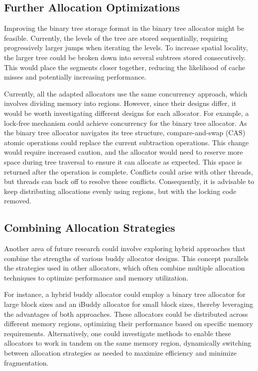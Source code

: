 \subsection{Further Allocation Optimizations} \label{sec:futureworkOptimizations}
Improving the binary tree storage format in the binary tree allocator might be feasible. Currently, the levels of the tree are stored sequentially, requiring progressively larger jumps when iterating the levels. To increase spatial locality, the larger tree could be broken down into several subtrees stored consecutively. This would place the segments closer together, reducing the likelihood of cache misses and potentially increasing performance.

Currently, all the adapted allocators use the same concurrency approach, which involves dividing memory into regions. However, since their designs differ, it would be worth investigating different designs for each allocator. For example, a lock-free mechanism could achieve concurrency for the binary tree allocator. As the binary tree allocator navigates its tree structure, compare-and-swap (CAS) atomic operations could replace the current subtraction operations. This change would require increased caution, and the allocator would need to reserve more space during tree traversal to ensure it can allocate as expected. This space is returned after the operation is complete. Conflicts could arise with other threads, but threads can back off to resolve these conflicts. Consequently, it is advisable to keep distributing allocations evenly using regions, but with the locking code removed.

% 

\subsection{Combining Allocation Strategies} \label{sec:futureworkCombine}
Another area of future research could involve exploring hybrid approaches that combine the strengths of various buddy allocator designs. This concept parallels the strategies used in other allocators, which often combine multiple allocation techniques to optimize performance and memory utilization.

For instance, a hybrid buddy allocator could employ a binary tree allocator for large block sizes and an iBuddy allocator for small block sizes, thereby leveraging the advantages of both approaches. These allocators could be distributed across different memory regions, optimizing their performance based on specific memory requirements. Alternatively, one could investigate methods to enable these allocators to work in tandem on the same memory region, dynamically switching between allocation strategies as needed to maximize efficiency and minimize fragmentation.
